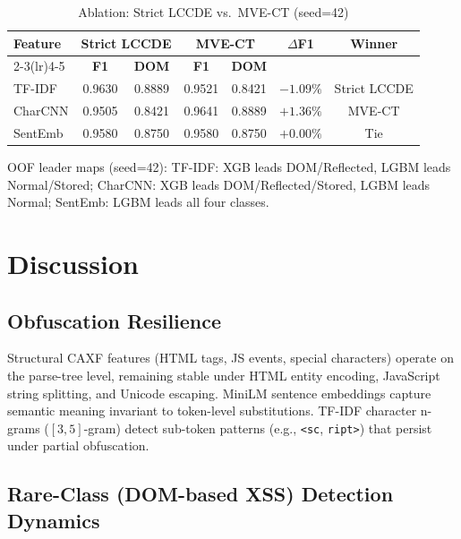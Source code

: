 \documentclass[conference]{IEEEtran}
\begin{document}
\begin{table}[t]
\centering
\caption{Ablation: Strict LCCDE vs.\ MVE-CT (seed=42)}
\label{tab:ablation}
\begin{tabular}{lcccccc}
\toprule
\textbf{Feature} &
  \multicolumn{2}{c}{\textbf{Strict LCCDE}} &
  \multicolumn{2}{c}{\textbf{MVE-CT}} &
  \textbf{$\Delta$F1} & \textbf{Winner} \\
\cmidrule(lr){2-3}\cmidrule(lr){4-5}
& \textbf{F1} & \textbf{DOM} & \textbf{F1} & \textbf{DOM} & & \\
\midrule
TF-IDF  & 0.9630 & 0.8889 & 0.9521 & 0.8421 & $-1.09\%$ & Strict LCCDE \\
CharCNN & 0.9505 & 0.8421 & 0.9641 & 0.8889 & $+1.36\%$ & MVE-CT \\
SentEmb & 0.9580 & 0.8750 & 0.9580 & 0.8750 & $+0.00\%$ & Tie \\
\bottomrule
\end{tabular}
\end{table}

OOF leader maps (seed=42):
TF-IDF: XGB leads DOM/Reflected, LGBM leads Normal/Stored;
CharCNN: XGB leads DOM/Reflected/Stored, LGBM leads Normal;
SentEmb: LGBM leads all four classes.

\section{Discussion}
\label{sec:discussion}

\subsection{Obfuscation Resilience}

Structural CAXF features (HTML tags, JS events, special characters) operate
on the parse-tree level, remaining stable under HTML entity encoding,
JavaScript string splitting, and Unicode escaping. MiniLM sentence embeddings
capture semantic meaning invariant to token-level substitutions. TF-IDF
character n-grams ($[3,5]$-gram) detect sub-token patterns (e.g.,
\texttt{<sc}, \texttt{ript>}) that persist under partial obfuscation.

\subsection{Rare-Class (DOM-based XSS) Detection Dynamics}
\end{document}
